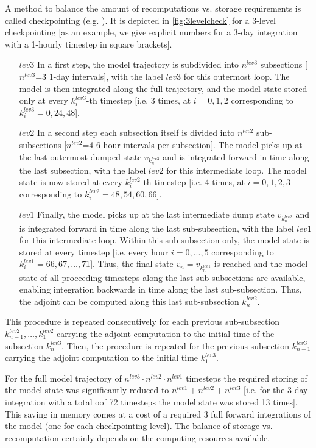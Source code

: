 A method to balance the amount of recomputations vs.
storage requirements is called {\sf checkpointing}
(e.g. \cite{res-eta:98}).
It is depicted in \ref{fig:3levelcheck} for a 3-level checkpointing
[as an example, we give explicit numbers for a 3-day 
integration with a 1-hourly timestep in square brackets].
\begin{itemize}
%
\item [$lev3$]
In a first step, the model trajectory is subdivided into 
$ {n}^{lev3} $ subsections [$ {n}^{lev3} $=3 1-day intervals],
with the label $lev3$ for this outermost loop.
The model is then integrated along the full trajectory,
and the model state stored only at every $ k_{i}^{lev3} $-th timestep 
[i.e. 3 times, at
$ i = 0,1,2 $ corresponding to $ k_{i}^{lev3} = 0, 24, 48 $].
%
\item [$lev2$]
In a second step each subsection itself is divided into
$ {n}^{lev2} $ sub-subsections
[$ {n}^{lev2} $=4 6-hour intervals per subsection].
The model picks up at the last outermost dumped state 
$ v_{k_{n}^{lev3}} $ and is integrated forward in time along
the last subsection, with the label $lev2$ for this  
intermediate loop. 
The model state is now stored at every $ k_{i}^{lev2} $-th 
timestep 
[i.e. 4 times, at
$ i = 0,1,2,3 $ corresponding to $ k_{i}^{lev2} = 48, 54, 60, 66 $].
%
\item [$lev1$]
Finally, the model picks up at the last intermediate dump state
$ v_{k_{n}^{lev2}} $ and is integrated forward in time along
the last sub-subsection, with the label $lev1$ for this  
intermediate loop.
Within this sub-subsection only, the model state is stored
at every timestep 
[i.e. every hour $ i=0,...,5$ corresponding to 
$ k_{i}^{lev1} = 66, 67, \ldots, 71 $].
Thus, the  final state $ v_n = v_{k_{n}^{lev1}} $ is reached
and the model state of all proceeding timesteps along the last
sub-subsections are available, enabling integration backwards
in time along the last sub-subsection.
Thus, the adjoint can be computed along this last 
sub-subsection $k_{n}^{lev2}$. 
%
\end{itemize}
%
This procedure is repeated consecutively for each previous
sub-subsection $k_{n-1}^{lev2}, \ldots, k_{1}^{lev2} $
carrying the adjoint computation to the initial time 
of the subsection $k_{n}^{lev3}$.
Then, the procedure is repeated for the previous subsection
$k_{n-1}^{lev3}$ 
carrying the adjoint computation to the initial time 
$k_{1}^{lev3}$.

For the full model trajectory of
$ n^{lev3} \cdot n^{lev2} \cdot n^{lev1} $ timesteps
the required storing of the model state was significantly reduced to
$ n^{lev1} + n^{lev2} + n^{lev3} $
[i.e. for the 3-day integration with a total oof 72 timesteps
the model state was stored 13 times].
This saving in memory comes at a cost of a required
3 full forward integrations of the model (one for each
checkpointing level).
The balance of storage vs. recomputation certainly depends
on the computing resources available.

